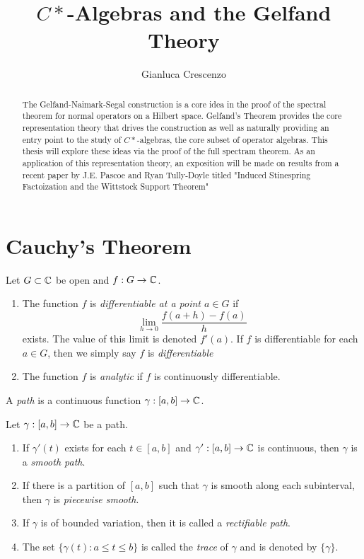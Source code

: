 \documentclass[reqno]{amsart}
\title[Banach and C*-Algebras, En Route to Continuous Functional Calculus]{$C*$-Algebras and the Gelfand Theory}
\author{Gianluca Crescenzo}
\begin{document}
\begin{abstract}
	The Gelfand-Naimark-Segal construction is a core idea in the proof of the spectral theorem for normal operators on a Hilbert space. Gelfand's Theorem provides the core representation theory that drives the construction as well as naturally providing an entry point to the study of $C*$-algebras, the core subset of operator algebras. This thesis will explore these ideas via the proof of the full spectram theorem. As an application of this representation theory, an exposition will be made on results from a recent paper by J.E. Pascoe and Ryan Tully-Doyle titled "Induced Stinespring Factoization and the Wittstock Support Theorem"
\end{abstract}

\maketitle

\iffalse
\section{Cauchy's Theorem}\label{Section:Cauchy's Theorem}

\begin{definition}
	Let $G \subset \mathbb{C}$ be open and $f:G \rightarrow \mathbb{C}$.
	\mbox{}
	\begin{enumerate}[label = (\arabic*),itemsep=1pt,topsep=3pt]
		\item The function $f$ is \emph{differentiable at a point $a \in G$} if
			\[
				\lim_{h \rightarrow 0}\frac{f(a+h) - f(a)}{h}
			\] 
			exists. The value of this limit is denoted $f'(a)$. If $f$ is differentiable for each $a \in G$, then we simply say $f$ is \emph{differentiable}
		\item The function $f$ is \emph{analytic} if $f$ is continuously differentiable.
	\end{enumerate}
\end{definition}

\begin{definition}
	A \emph{path} is a continuous function $\gamma:[a,b] \rightarrow \mathbb{C}$.
\end{definition}

\begin{definition}
	Let $\gamma:[a,b] \rightarrow \mathbb{C}$ be a path.
	\mbox{}
	\begin{enumerate}[label = (\arabic*),itemsep=1pt,topsep=3pt]
		\item If $\gamma'(t)$ exists for each $t \in [a,b]$ and $\gamma':[a,b] \rightarrow \mathbb{C}$ is continuous, then $\gamma$ is a \emph{smooth path}.
		\item If there is a partition of $[a,b]$ such that $\gamma$ is smooth along each subinterval, then $\gamma$ is \emph{piecewise smooth}.
		\item If $\gamma$ is of bounded variation, then it is called a \emph{rectifiable path}.
		\item The set $\{\gamma(t):a \leq t \leq b\}$ is called the \emph{trace} of $\gamma$ and is denoted by $\{\gamma\}$.
	\end{enumerate}
\end{definition}
\end{document}
